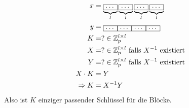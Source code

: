 \documentclass[main.tex]{subfiles}
\begin{document}
\subsection{}
\subsubsection{}
\begin{align*}
  x &= \underbrace{\framebox{\ldots}}_{l}\underbrace{\framebox{\ldots}}_{l}\underbrace{\framebox{\ldots}}_{l}\underbrace{\framebox{\ldots}}_{l}\\
  y &= \framebox{\ldots}\framebox{\ldots}\framebox{\ldots}\framebox{\ldots}\\
  K &= ? \in \mathbb{Z}_{p}^{l\times l}\\
  X &= ? \in \mathbb{Z}_{p}^{l\times l} \text{ falls  } X^{-1} \text{ existiert  }\\
  Y &= ? \in \mathbb{Z}_{p}^{l\times l} \text{ falls  } X^{-1} \text{ existiert  }\\
  X \cdot K &= Y\\
  \Rightarrow K &= X^{-1}Y\\
\end{align*}
Also ist $K$ einziger passender Schlüssel für die Blöcke.
\end{document}
